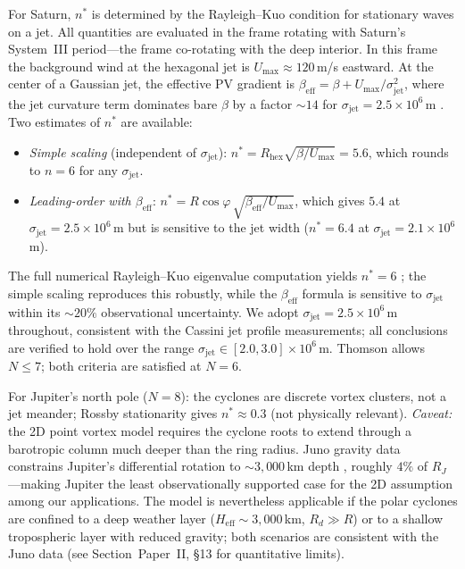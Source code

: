 For Saturn, $n^*$ is determined by the Rayleigh--Kuo condition for
stationary waves on a jet.  All quantities are evaluated in the frame
rotating with Saturn's System~III period---the frame co-rotating with
the deep interior.  In this frame the background wind at the hexagonal
jet is $U_{\max} \approx 120$\,m/s eastward.  At the center of a
Gaussian jet, the effective PV gradient is
$\beta_{\mathrm{eff}} = \beta + U_{\max}/\sigma_{\mathrm{jet}}^2$,
where the jet curvature term dominates bare $\beta$ by a factor
$\sim\!14$ for $\sigma_{\mathrm{jet}} = 2.5 \times 10^6$\,m
\citep{Pedlosky1987, Vallis2017}.
Two estimates of $n^*$ are available:
\begin{itemize}
  \item \emph{Simple scaling} (independent of $\sigma_{\mathrm{jet}}$):
    $n^* = R_{\mathrm{hex}}\sqrt{\beta/U_{\max}} = 5.6$, which
    rounds to $n = 6$ for any $\sigma_{\mathrm{jet}}$.
  \item \emph{Leading-order with $\beta_{\mathrm{eff}}$}:
    $n^* = R\cos\varphi\,\sqrt{\beta_{\mathrm{eff}}/U_{\max}}$,
    which gives $5.4$ at $\sigma_{\mathrm{jet}} = 2.5 \times 10^6$\,m
    but is sensitive to the jet width ($n^* = 6.4$ at
    $\sigma_{\mathrm{jet}} = 2.1 \times 10^6$\,m).
\end{itemize}
The full numerical Rayleigh--Kuo eigenvalue computation yields
$n^* = 6$ \citep{SanchezLavega2014}; the simple scaling reproduces
this robustly, while the $\beta_{\mathrm{eff}}$ formula is sensitive
to $\sigma_{\mathrm{jet}}$ within its $\sim\!20\%$ observational
uncertainty.  We adopt
$\sigma_{\mathrm{jet}} = 2.5 \times 10^6$\,m throughout, consistent
with the Cassini jet profile measurements; all conclusions are
verified to hold over the range
$\sigma_{\mathrm{jet}} \in [2.0, 3.0] \times 10^6$\,m.
Thomson allows $N \le 7$; both criteria are satisfied at $N = 6$.

For Jupiter's north pole ($N = 8$): the cyclones are discrete vortex
clusters, not a jet meander; Rossby stationarity gives
$n^* \approx 0.3$ (not physically relevant).  \emph{Caveat:} the 2D
point vortex model requires the cyclone roots to extend through a
barotropic column much deeper than the ring radius.  Juno gravity
data constrains Jupiter's differential rotation to
$\sim\!3{,}000$\,km depth \citep{Kaspi2018}, roughly $4\%$ of
$R_J$---making Jupiter the least observationally supported case for
the 2D assumption among our applications.  The model is nevertheless
applicable if the polar cyclones are confined to a deep weather layer
($H_{\mathrm{eff}} \sim 3{,}000$\,km, $R_d \gg R$) or to a shallow
tropospheric layer with reduced gravity; both scenarios are consistent
with the Juno data (see Section~Paper~II, \S13 for
quantitative limits).

